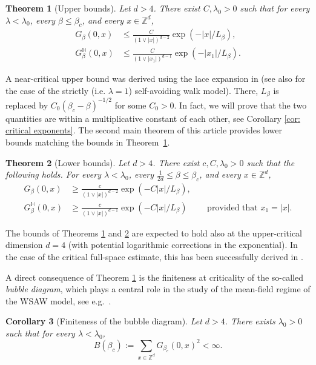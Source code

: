 \documentclass[11pt,a4paper]{article}
\numberwithin{equation}{section}
\theoremstyle{plain}
\newtheorem{Thm}{Theorem}[section]
\newtheorem{Cor}[Thm]{Corollary}
\theoremstyle{definition}
\begin{document}
\begin{Thm}[Upper bounds]\label{thm:mainwsaw} Let $d>4$.
There exist $C,\lambda_0>0$ such that for every $\lambda<\lambda_0$, every $\beta\le\beta_c$, and every $x\in \mathbb Z^d$,
\begin{align}
\label{eq:bound full plane}
G_\beta(0,x)&\le \frac{C}{(1\vee |x|)^{d-2}}\exp(-|x|/L_\beta),\\
\label{eq:bound half plane} G_\beta^\mathbb H(0,x)&\le \frac{C}{(1\vee|x_1|)^{d-1}}\exp(-|x_1|/L_\beta).
\end{align}
\end{Thm}
A near-critical upper bound was derived using the lace expansion in \cite{Slade2023near} (see also \cite{Liu2023Plateau} for the case of the strictly (i.e. $\lambda=1$) self-avoiding walk model). There, $L_\beta$ is replaced by $C_0(\beta_c-\beta)^{-1/2}$ for some $C_0>0$. In fact, we will prove that the two quantities are within a multiplicative constant of each other, see Corollary \ref{cor: critical exponents}.
The second main theorem of this article provides lower bounds matching the bounds in Theorem~\ref{thm:mainwsaw}.
\begin{Thm}[Lower bounds]\label{thm:main2wsaw} Let $d>4$.
There exist $c,C,\lambda_0>0$  such that the following holds. For every $\lambda<\lambda_0$, every $\tfrac{1}{2d}\le \beta\leq\beta_c$, and every $x\in \mathbb Z^d$,
\begin{align}
\label{eq:bound full plane 2}
G_\beta(0,x)&\ge \frac{c}{(1\vee|x|)^{d-2}}\exp(-C|x|/L_\beta),\\
\label{eq:bound half plane 2}G_\beta^\mathbb H(0,x)&\ge \frac{c}{(1\vee|x|)^{d-1}}\exp(-C|x|/L_\beta)\qquad\text{ provided that }x_1=|x|.
\end{align}
\end{Thm}
The bounds of Theorems \ref{thm:mainwsaw} and \ref{thm:main2wsaw} are expected to hold also at the upper-critical dimension $d=4$ (with potential logarithmic corrections in the exponential). In the case of the critical full-space estimate, this has been successfully derived in \cite{BauerschmidtBrydgesSlade2015WSAW4D}.

A direct consequence of Theorem \ref{thm:mainwsaw} is the finiteness at criticality of the so-called \emph{bubble diagram}, which plays a central role in the study of the mean-field regime of the WSAW model, see e.g.~\cite{BovierFelderFrohlich1984BubbleFiniteWSAW,SladeSaintFlourLaceExpansion2006,BauerschmidtDCGoodmanSlade}.
\begin{Cor}[Finiteness of the bubble diagram]\label{cor: finiteness bubble} Let $d>4$. There exists $\lambda_0>0$ such that for every $\lambda<\lambda_0$,
\begin{equation}
	B(\beta_c):=\sum_{x\in \mathbb Z^d}G_{\beta_c}(0,x)^2<\infty.
\end{equation}
\end{Cor}
\end{document}
